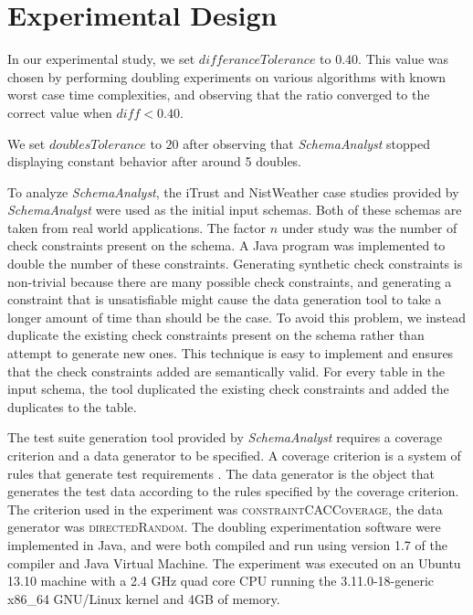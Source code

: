 \section{Experimental Design}

In our experimental study, we set $\mathit{differanceTolerance}$ to
$0.40$. This value was chosen by performing doubling
experiments on various algorithms with known worst case time
complexities, and observing that the ratio converged to the correct
value when $\mathit{diff} < 0.40$.

We set $\mathit{doublesTolerance}$ to $20$ after observing that
\textit{SchemaAnalyst} stopped displaying constant behavior after around
5 doubles.

To analyze \textit{SchemaAnalyst}, the iTrust and NistWeather case
studies provided by \textit{SchemaAnalyst} were used as the initial 
input schemas.
Both of these schemas are taken from real world applications. The factor $n$
under study was the number of check constraints present on the schema.  
A Java program was
implemented to double the number of these constraints. Generating
synthetic check constraints is non-trivial because there are many
possible check constraints, and generating a constraint that is
unsatisfiable might cause the data generation tool to take a longer
amount of time than should be the case. To avoid this problem, we
instead duplicate the existing check constraints present on the schema
rather than attempt to generate new ones. This technique is easy
to implement and ensures that the check constraints added are
semantically valid.  For every table in the input schema, the tool 
duplicated the existing check constraints and added the duplicates 
to the table.  

The test suite generation tool provided by \textit{SchemaAnalyst}
requires a coverage criterion and a data generator to be specified. A
coverage criterion is a system of rules that generate test requirements
\cite{Ammann:Testing}. The data generator is the object that generates
the test data according to the rules specified by the coverage
criterion. The criterion used in the experiment was
\textsc{constraintCACCoverage}, 
the data generator was \textsc{directedRandom}. The
doubling experimentation software were implemented in Java, and were both compiled and run using
version 1.7 of the compiler and Java Virtual Machine. The experiment was executed on an Ubuntu 13.10 machine with a 2.4
GHz quad core CPU running the 3.11.0-18-generic x86\_64 GNU/Linux
kernel and 4GB of memory.

